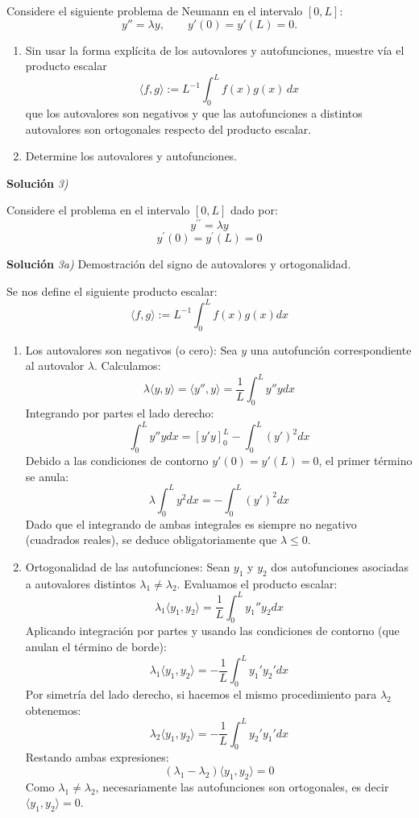 \documentclass[11pt,spanish]{article}
\newcounter{problema}
\newcommand{\prob}{\stepcounter{problema} \vspace{.5cm} \noindent{\bf Problema \arabic{problema}: }}
\begin{document}
\prob Considere el siguiente problema de Neumann en el intervalo $[0, L]$:
\[
y'' = \lambda y,\qquad y'(0)=y'(L)=0.
\]
\begin{enumerate}
\item Sin usar la forma explícita de los autovalores y autofunciones, muestre vía el producto escalar
\[
\langle f, g\rangle := L^{-1}\int_0^L f(x)g(x)\,dx
\]
que los autovalores son negativos y que las autofunciones a distintos autovalores son ortogonales respecto del producto escalar.
\item Determine los autovalores y autofunciones.
\end{enumerate}

\vspace{0.5cm}
{\bf Soluci\'on }{\em 3)}
\vspace{0.5cm}

Considere el problema en el intervalo $[0, L]$ dado por:
$$y^{\prime\prime}=\lambda y$$
$$y^{\prime}(0)=y^{\prime}(L)=0$$

\vspace{0.5cm}
{\bf Soluci\'on }{\em 3a)}
Demostración del signo de autovalores y ortogonalidad.
\vspace{0.5cm}

Se nos define el siguiente producto escalar:
$$\langle f,g\rangle:=L^{-1}\int_{0}^{L}f(x)g(x)dx$$
\begin{enumerate}
\item Los autovalores son negativos (o cero):
Sea $y$ una autofunción correspondiente al autovalor $\lambda$. Calculamos:
$$\lambda \langle y, y \rangle = \langle y'', y \rangle = \frac{1}{L} \int_0^L y'' y dx$$
Integrando por partes el lado derecho:
$$\int_0^L y'' y dx = \left[ y' y \right]_0^L - \int_0^L (y')^2 dx$$
Debido a las condiciones de contorno $y'(0)=y'(L)=0$, el primer término se anula:
$$\lambda \int_0^L y^2 dx = - \int_0^L (y')^2 dx$$
Dado que el integrando de ambas integrales es siempre no negativo (cuadrados reales), se deduce obligatoriamente que $\lambda \le 0$.

\item Ortogonalidad de las autofunciones:
Sean $y_1$ y $y_2$ dos autofunciones asociadas a autovalores distintos $\lambda_1 \neq \lambda_2$.
Evaluamos el producto escalar:
$$\lambda_1 \langle y_1, y_2 \rangle = \frac{1}{L} \int_0^L y_1'' y_2 dx$$
Aplicando integración por partes y usando las condiciones de contorno (que anulan el término de borde):
$$\lambda_1 \langle y_1, y_2 \rangle = -\frac{1}{L} \int_0^L y_1' y_2' dx$$
Por simetría del lado derecho, si hacemos el mismo procedimiento para $\lambda_2$ obtenemos:
$$\lambda_2 \langle y_1, y_2 \rangle = -\frac{1}{L} \int_0^L y_2' y_1' dx$$
Restando ambas expresiones:
$$(\lambda_1 - \lambda_2)\langle y_1, y_2 \rangle = 0$$
Como $\lambda_1 \neq \lambda_2$, necesariamente las autofunciones son ortogonales, es decir $\langle y_1, y_2 \rangle = 0$.
\end{enumerate}
\end{document}
